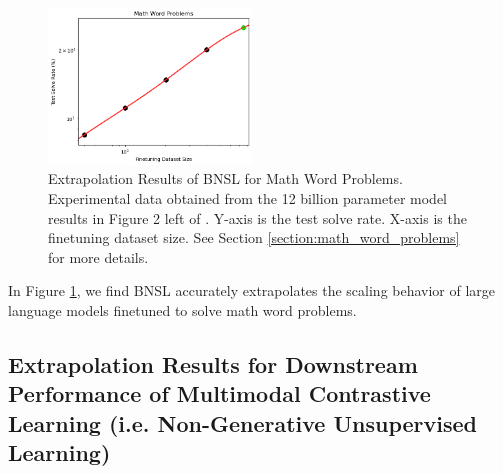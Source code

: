 \documentclass{article} %
\begin{document}
\begin{figure}[htbp]
    \centering
\includegraphics[width=0.48\textwidth]{figures/math_word_problems/dataset_size__12b_params.png}
    \caption{
Extrapolation Results of BNSL for Math Word Problems. Experimental data obtained from the 12 billion parameter model results in Figure 2 left of \cite{cobbe2021training}. Y-axis is the test solve rate. X-axis is the finetuning dataset size. See Section \ref{section:math_word_problems} for more details.
    }
    \label{fig:math_word_problems}
\end{figure}

In Figure \ref{fig:math_word_problems}, we find BNSL accurately extrapolates the scaling behavior of large language models finetuned to solve math word problems.



\clearpage

\subsection{Extrapolation Results for Downstream Performance of Multimodal Contrastive Learning (i.e. Non-Generative Unsupervised Learning)}
\label{section:extrapolate_contrastive}
\end{document}
